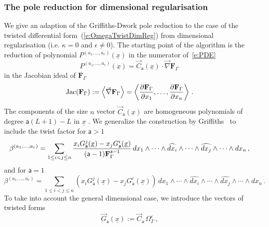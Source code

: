 \documentclass[a4paper,12pt]{article}
\numberwithin{equation}{section}
\numberwithin{figure}{section}
\begin{document}
  
  \subsubsection{The pole reduction for dimensional
    regularisation}\label{sec:PoleRed}
We give an adaption of the Griffiths-Dwork pole reduction to the case
of the twisted differential form~(\ref{e:OmegaTwistDimReg}) from
dimensional regularisation (i.e. $\kappa=0$ and $\epsilon\neq0$).
The starting point of the algorithm is the reduction of polynomial
$P^{(a_1,\dots,a_r)}(\underline x)$  in the numerator
of~\eqref{e:PDE}
\begin{equation}\label{e:RedF}
	P^{(a_1,\dots,a_r)}(\underline x) = \vec C_{\mathsf{a}}(\underline x)\cdot
	\vec\nabla   \textbf{F}_\Gamma \, 
\end{equation}
in the Jacobian ideal of $\textbf{F}_\Gamma$ 
 \begin{equation}
	\textrm{Jac}(   \textbf{F}_\Gamma) :=\left\langle\vec\nabla  \textbf{F}_\Gamma \right\rangle =\left\langle{\partial
		\textbf{F}_\Gamma\over\partial x_1},\dots,  {\partial
		\textbf{F}_\Gamma\over\partial x_n}\right\rangle\,.
\end{equation}
%
The components of the size $n$ vector $ \vec C_{\mathsf{a}}(\underline x)$ are homogeneous polynomials of degree
$\mathsf{a}(L+1)-L$ in  $\underline x$ . 
%
   We generalize the construction by
   Griffiths~\cite{Griffith1,Griffith2} to include the twist factor
   for $\mathsf{a}>1$ 
   \begin{equation}\label{e:betadef}
  \beta^{(a_1,\dots,a_r)}=  \sum_{1\leq i<j\leq n} {x_i
    G_{\mathsf{a}}^j  (\underline x)-x_j
   G_{\mathsf{a}}^i(\underline x)\over
    (\mathsf{a}-1)\textbf{F}_\Gamma^{\mathsf{a}-1}}\, 
 dx_1\wedge \cdots \wedge \widehat{dx_i}\wedge \cdots \wedge\widehat{dx_j}\wedge
  \cdots \wedge dx_n \, ,
\end{equation}
and for $\mathsf{a}=1$
  \begin{equation}\label{e:betadefa1}
  \beta^{(a_1,\dots,a_r)}=  \sum_{1\leq i<j\leq n} \left(x_i
    G_{\mathsf{a}}^j  (\underline x)-x_j
   G_{\mathsf{a}}^i(\underline x)\right)\, 
 dx_1\wedge \cdots \wedge \widehat{dx_i}\wedge \cdots \wedge\widehat{dx_j}\wedge
  \cdots \wedge dx_n \, .
\end{equation}
To take into account the general dimensional case, we introduce 
the vectors of twisted forms
\begin{equation}
  \label{e:Gdef}
\vec  G_{\mathsf{a}}(\underline x):=   \vec C_{\mathsf{a}} \,\Omega_\Gamma^\epsilon \, ,
\end{equation}
\end{document}
